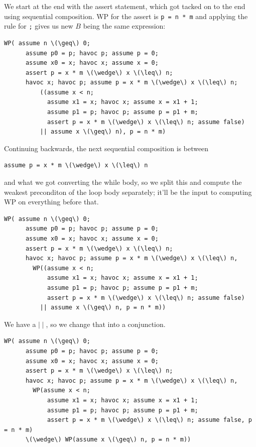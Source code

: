 \documentclass[11pt]{article}
\begin{document}
We start at the end with the \textsf{assert} statement, which got tacked on to the end using sequential composition. WP for the assert is \texttt{p = n * m} and
applying the rule for \verb+;+ gives us new $B$ being the same expression:
\begin{Verbatim}[commandchars=\\\{\}]
  WP( assume n \(\geq\) 0;
      assume p0 = p; havoc p; assume p = 0; 
      assume x0 = x; havoc x; assume x = 0; 
      assert p = x * m \(\wedge\) x \(\leq\) n;
      havoc x; havoc p; assume p = x * m \(\wedge\) x \(\leq\) n;
          ((assume x < n; 
            assume x1 = x; havoc x; assume x = x1 + 1; 
            assume p1 = p; havoc p; assume p = p1 + m; 
            assert p = x * m \(\wedge\) x \(\leq\) n; assume false) 
          || assume x \(\geq\) n), p = n * m)
\end{Verbatim}
Continuing backwards, the next sequential composition is between
\begin{Verbatim}[commandchars=\\\{\}]
  assume p = x * m \(\wedge\) x \(\leq\) n
\end{Verbatim}
and what we got converting the \textsf{while} body, so we split this and
compute the weakest preconditon of the loop body separately; it'll be the input to computing
WP on everything before that.
\begin{Verbatim}[commandchars=\\\{\}]
  WP( assume n \(\geq\) 0;
      assume p0 = p; havoc p; assume p = 0; 
      assume x0 = x; havoc x; assume x = 0; 
      assert p = x * m \(\wedge\) x \(\leq\) n;
      havoc x; havoc p; assume p = x * m \(\wedge\) x \(\leq\) n,
        WP((assume x < n; 
            assume x1 = x; havoc x; assume x = x1 + 1; 
            assume p1 = p; havoc p; assume p = p1 + m; 
            assert p = x * m \(\wedge\) x \(\leq\) n; assume false) 
          || assume x \(\geq\) n, p = n * m))
\end{Verbatim}
We have a $\mid\mid$, so we change that into a conjunction.
\begin{Verbatim}[commandchars=\\\{\}]
  WP( assume n \(\geq\) 0;
      assume p0 = p; havoc p; assume p = 0; 
      assume x0 = x; havoc x; assume x = 0; 
      assert p = x * m \(\wedge\) x \(\leq\) n;
      havoc x; havoc p; assume p = x * m \(\wedge\) x \(\leq\) n,
        WP(assume x < n; 
            assume x1 = x; havoc x; assume x = x1 + 1; 
            assume p1 = p; havoc p; assume p = p1 + m; 
            assert p = x * m \(\wedge\) x \(\leq\) n; assume false, p = n * m)
      \(\wedge\) WP(assume x \(\geq\) n, p = n * m))
\end{Verbatim}
\end{document}
